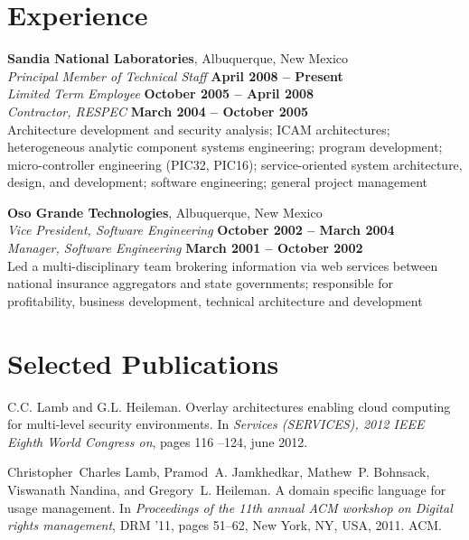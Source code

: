 \documentclass[margin,line]{resume}
\begin{document}
\begin{resume}
\section{\mysidestyle Experience}
{\bf Sandia National Laboratories}, Albuquerque, New Mexico \vspace{2mm} \\
{\sl Principal Member of Technical Staff} \hfill \textbf{April 2008 -- Present} \\
{\sl Limited Term Employee} \hfill \textbf{October 2005 -- April 2008} \\
{\sl Contractor, RESPEC} \hfill \textbf{March 2004 -- October 2005} \vspace{1mm} \\
Architecture development and security analysis; ICAM architectures; heterogeneous analytic component systems engineering; program development; micro-controller engineering (PIC32, PIC16); service-oriented system architecture, design, and development; software engineering; general project management 

{\bf Oso Grande Technologies}, Albuquerque, New Mexico \vspace{2mm} \\
{\sl Vice President, Software Engineering} \hfill \textbf{October 2002 -- March 2004} \\
{\sl Manager, Software Engineering} \hfill \textbf{March 2001 -- October 2002} \vspace{1mm} \\
Led a multi-disciplinary team brokering information via web services between national insurance aggregators and state governments; responsible for profitability, business development, technical architecture and development

\section{\mysidestyle Selected Publications}
C.C. Lamb and G.L. Heileman.
\newblock Overlay architectures enabling cloud computing for multi-level
  security environments.
\newblock In {\em Services (SERVICES), 2012 IEEE Eighth World Congress on},
  pages 116 --124, june 2012.

Christopher~Charles Lamb, Pramod~A. Jamkhedkar, Mathew~P. Bohnsack, Viswanath
  Nandina, and Gregory~L. Heileman.
\newblock A domain specific language for usage management.
\newblock In {\em Proceedings of the 11th annual ACM workshop on Digital rights
  management}, DRM '11, pages 51--62, New York, NY, USA, 2011. ACM.


\end{resume}
\end{document}
